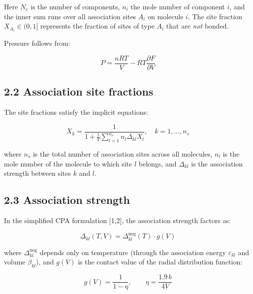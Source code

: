 \documentclass[review,3p]{elsarticle}
\begin{document}
Here $N_c$ is the number of components, $n_i$ the mole number of component $i$, and the inner sum runs over all association sites $A_i$ on molecule $i$. The site fraction $X_{A_i} \in (0,1]$ represents the fraction of sites of type $A_i$ that are \textit{not} bonded.

Pressure follows from:

\begin{equation}

P = \frac{nRT}{V} - RT \frac{\partial F}{\partial V}

\end{equation}

\subsection{2.2 Association site fractions}

The site fractions satisfy the implicit equations:

\begin{equation}

X_k = \frac{1}{1 + \displaystyle\frac{1}{V} \sum_{l=1}^{n_s} n_l \Delta_{kl} X_l}, \quad k = 1, \ldots, n_s

\end{equation}

where $n_s$ is the total number of association sites across all molecules, $n_l$ is the mole number of the molecule to which site $l$ belongs, and $\Delta_{kl}$ is the association strength between sites $k$ and $l$.

\subsection{2.3 Association strength}

In the simplified CPA formulation [1,2], the association strength factors as:

\begin{equation}

\Delta_{kl}(T, V) = \Delta_{kl}^{\text{nog}}(T) \cdot g(V)

\end{equation}

where $\Delta_{kl}^{\text{nog}}$ depends only on temperature (through the association energy $\varepsilon_{kl}$ and volume $\beta_{kl}$), and $g(V)$ is the contact value of the radial distribution function:

\begin{equation}

g(V) = \frac{1}{1 - \eta}, \qquad \eta = \frac{1.9 \, b}{4V}

\end{equation}
\end{document}
